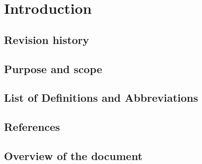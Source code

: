 \chapter{Introduction} \label{chap:introduction}



\section{Revision history}



\section{Purpose and scope}



\section{List of Definitions and Abbreviations}

\section{References}


\section{Overview of the document}
